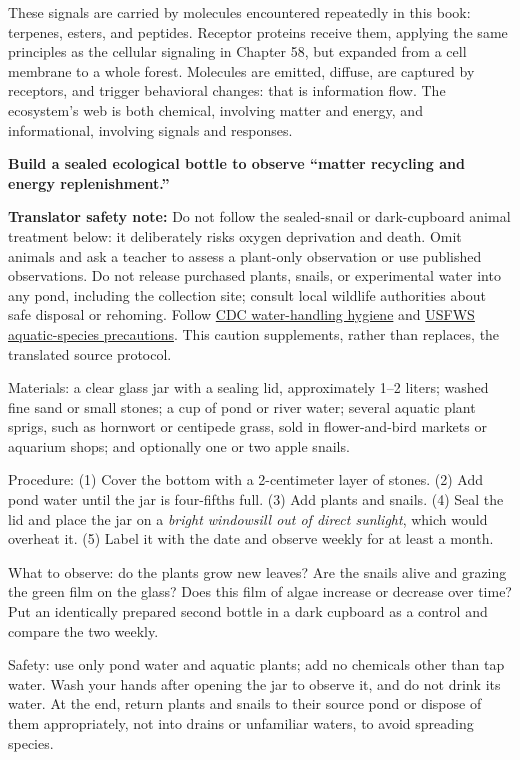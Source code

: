 These signals are carried by molecules encountered repeatedly in this book: terpenes, esters, and peptides. Receptor proteins receive them, applying the same principles as the cellular signaling in Chapter 58, but expanded from a cell membrane to a whole forest. Molecules are emitted, diffuse, are captured by receptors, and trigger behavioral changes: that is information flow. The ecosystem's web is both chemical, involving matter and energy, and informational, involving signals and responses.

\begin{shiyan}
\textbf{Build a sealed ecological bottle to observe ``matter recycling and energy replenishment.''}

\textbf{Translator safety note:} Do not follow the sealed-snail or dark-cupboard animal treatment below: it deliberately risks oxygen deprivation and death. Omit animals and ask a teacher to assess a plant-only observation or use published observations. Do not release purchased plants, snails, or experimental water into any pond, including the collection site; consult local wildlife authorities about safe disposal or rehoming. Follow \href{https://www.cdc.gov/healthy-pets/about/fish.html}{CDC water-handling hygiene} and \href{https://www.fws.gov/learn/protect-your-waters}{USFWS aquatic-species precautions}. This caution supplements, rather than replaces, the translated source protocol.

Materials: a clear glass jar with a sealing lid, approximately 1--2 liters; washed fine sand or small stones; a cup of pond or river water; several aquatic plant sprigs, such as hornwort or centipede grass, sold in flower-and-bird markets or aquarium shops; and optionally one or two apple snails.

Procedure: (1) Cover the bottom with a 2-centimeter layer of stones. (2) Add pond water until the jar is four-fifths full. (3) Add plants and snails. (4) Seal the lid and place the jar on a \emph{bright windowsill out of direct sunlight}, which would overheat it. (5) Label it with the date and observe weekly for at least a month.

What to observe: do the plants grow new leaves? Are the snails alive and grazing the green film on the glass? Does this film of algae increase or decrease over time? Put an identically prepared second bottle in a dark cupboard as a control and compare the two weekly.

Safety: use only pond water and aquatic plants; add no chemicals other than tap water. Wash your hands after opening the jar to observe it, and do not drink its water. At the end, return plants and snails to their source pond or dispose of them appropriately, not into drains or unfamiliar waters, to avoid spreading species.


\end{shiyan}
